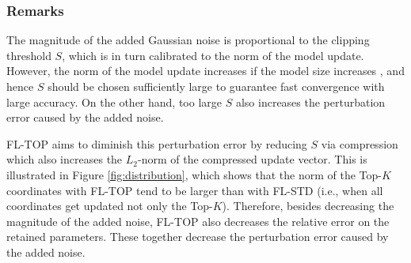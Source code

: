 \documentclass[accepted]{uai2021} %
\newcommand{\TOPK}{Top-$K$\xspace}
\begin{document}
\subsubsection{Remarks}

The magnitude of the added Gaussian noise is proportional to the clipping threshold $S$, which is in turn calibrated to the norm of the model update. However, the norm of the model update increases if the model size increases \citep{zhu2020votingbased}, and hence $S$ should be chosen sufficiently large to guarantee fast convergence with large accuracy. On the other hand, too large $S$ also increases the perturbation error caused by the added noise.



FL-TOP aims to diminish this perturbation error by reducing $S$ via compression which also increases the $L_2$-norm of the compressed update vector. This is illustrated in Figure \ref{fig:distribution}, which shows that the norm of the \TOPK coordinates with FL-TOP tend to be larger than with FL-STD (i.e., when all coordinates get updated not only the \TOPK). Therefore, besides decreasing the magnitude of the added noise, FL-TOP also decreases the relative error on the retained parameters. These together decrease the perturbation error caused by the added noise. %

\end{document}
